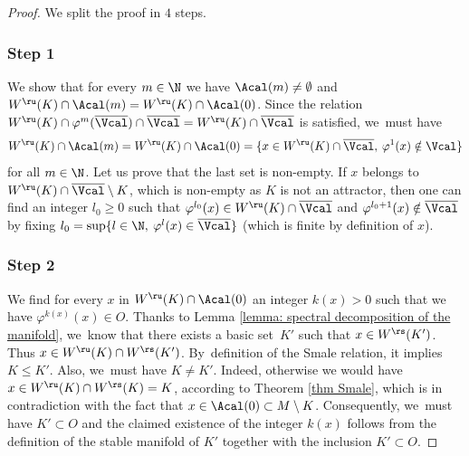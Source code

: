 \begin{proof}We split the proof in $4$ steps.

\Changel
\subsubsection*{Step 1} We show that for every $m \in \N$ we have $\Acal(m) \neq \emptyset$ and $W^\ru (K) \cap \Acal(m) = W^\ru (K) \cap \Acal(0)$. Since the relation $W^\ru (K) \cap \varphi^{m} (\overline{\Vcal}) \cap \overline{\Vcal} = W^\ru (K) \cap \overline{\Vcal}$ is satisfied, we~must have
\[
W^\ru (K)\cap \Acal (m) = W^\ru (K) \cap \Acal (0) = \{ x \in W^\ru (K) \cap \overline{\Vcal}, \: \varphi^{1} (x) \notin \Vcal \}
\]
for all $m \in \N$. Let us prove that the last set is non-empty. If $x$ belongs to \hbox{$W^\ru (K) \cap \overline{\Vcal} \setminus K$}, which is non-empty as $K$ is not an attractor, then one can find an integer $l_0 \geq 0$ such that $\varphi^{l_0}(x) \in W^\ru (K) \cap \overline{\Vcal}$ and $\varphi^{l_0 + 1}(x) \notin \overline{\Vcal}$ by fixing $l_0 = \sup \{ l \in \N, \: \varphi^{l} (x) \in \overline{\Vcal} \}$ (which is finite by definition of $x$).

\subsubsection*{Step 2} We find for every $x$ in $W^\ru (K) \cap \Acal(0)$ an integer $k (x) > 0$ such that we have $\varphi^{k (x)}(x) \in O$. Thanks to Lemma \ref{lemma: spectral decomposition of the manifold}, we~know that there exists a basic set~$K'$ such that $x \in W^\rs (K')$. Thus $x \in W^\ru (K) \cap W^\rs (K')$. By~definition of the Smale relation, it implies $K \leq K'$. Also, we~must have $K \neq K'$. Indeed, otherwise we would have $x \in W^\ru (K) \cap W^\rs (K) = K$, according to Theorem \ref{thm Smale}, which is in contradiction with the fact that $x \in \Acal (0) \subset M\setminus K$. Consequently, we~must have $K' \subset O$ and the claimed existence of the integer $k (x)$ follows from the definition of the stable manifold of $K'$ together with the inclusion $K' \subset O$.


\end{proof}
